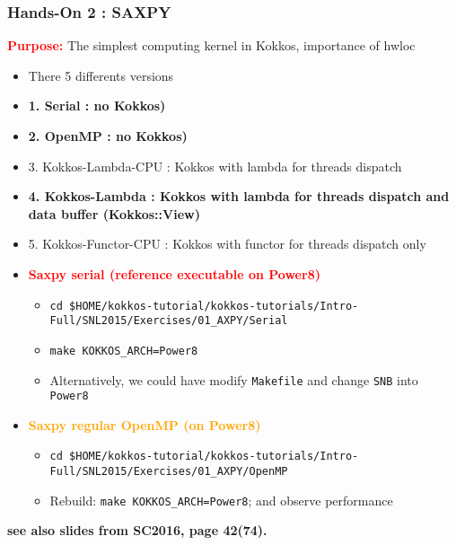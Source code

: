 \begin{frame}[fragile=singleslide]
  \frametitle{Hands-On 2 : SAXPY}

  {\large \textcolor{red}{\textbf{Purpose:}} The simplest computing kernel in Kokkos, importance of hwloc}

  \begin{itemize}
  \item There 5 differents versions
  \item \textbf{1. Serial : no Kokkos)}
  \item \textbf{2. OpenMP : no Kokkos)}
  \item 3. Kokkos-Lambda-CPU : Kokkos with lambda for threads dispatch
  \item \textbf{4. Kokkos-Lambda : Kokkos with lambda for threads dispatch and data buffer (Kokkos::View)}
  \item 5. Kokkos-Functor-CPU : Kokkos with functor for threads dispatch only
  \end{itemize}
  
  \begin{itemize}
  \item \textcolor{red}{\textbf{Saxpy serial (reference executable on Power8)}}
    \begin{itemize}
    \item \texttt{cd \$HOME/kokkos-tutorial/kokkos-tutorials/Intro-Full/SNL2015/Exercises/01\_AXPY/Serial}
    \item \texttt{make KOKKOS\_ARCH=Power8}
    \item Alternatively, we could have modify \texttt{Makefile} and change \texttt{SNB} into \texttt{Power8}
    \end{itemize}
  \item \textcolor{orange}{\textbf{Saxpy regular OpenMP (on Power8)}}
    \begin{itemize}
    \item \texttt{cd \$HOME/kokkos-tutorial/kokkos-tutorials/Intro-Full/SNL2015/Exercises/01\_AXPY/OpenMP}
    \item Rebuild: \texttt{make KOKKOS\_ARCH=Power8}; and observe performance
    \end{itemize}
  \end{itemize}

  \textbf{see also slides from SC2016, page 42(74).}
  
\end{frame}

